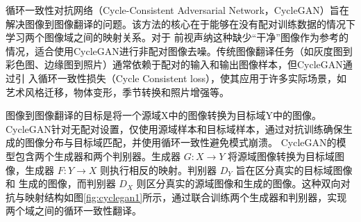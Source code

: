 循环一致性对抗网络（Cycle-Consistent Adversarial Network，CycleGAN）旨在解决图像到图像翻译的问题。该方法的核心在于能够在没有配对训练数据的情况下学习两个图像域之间的映射关系。对于
前视声纳这种缺少“干净”图像作为参考的情况，适合使用CycleGAN进行非配对图像去噪。传统图像翻译任务（如灰度图到彩色图、边缘图到照片）通常依赖于配对的输入和输出图像样本，但CycleGAN通过引
入循环一致性损失（Cycle Consistent loss），使其应用于许多实际场景，如艺术风格迁移，物体变形，季节转换和照片增强等。

图像到图像翻译的目标是将一个源域X中的图像转换为目标域Y中的图像。CycleGAN针对无配对设置，仅使用源域样本和目标域样本，通过对抗训练确保生成的图像分布与目标域匹配，并使用循环一致性避免模式崩溃。
CycleGAN的模型包含两个生成器和两个判别器。生成器 $G: X \rightarrow Y$ 将源域图像转换为目标域图像，生成器 $F: Y \rightarrow X$ 则执行相反的映射。判别器 $D_Y$ 旨在区分真实的目标域图像和
生成的图像，而判别器 $D_X$ 则区分真实的源域图像和生成的图像。这种双向对抗与映射结构如图\ref{fig:cyclegan1}所示，通过联合训练两个生成器和判别器，实现两个域之间的循环一致性翻译。

